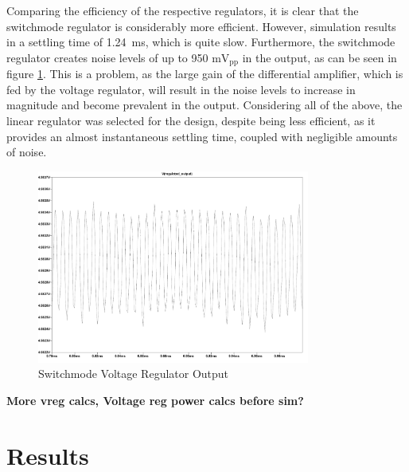 Comparing the efficiency of the respective regulators, it is clear that the switchmode regulator is considerably more efficient. However, simulation results in a settling time of \SI{1.24}{ms}, which is quite slow. Furthermore, the switchmode regulator creates noise levels of up to 950 $\mathrm{mV_{pp}}$ in the output, as can be seen in figure \ref{fig:smnoise}. This is a problem, as the large gain of the differential amplifier, which is fed by the voltage regulator, will result in the noise levels to increase in magnitude and become prevalent in the output. Considering all of the above, the linear regulator was selected for the design, despite being less efficient, as it provides an almost instantaneous settling time, coupled with negligible amounts of noise.

\begin{figure}[h]
    \centering
    \includegraphics[width = 0.8\textwidth]{Figures/smnoise}
    \caption{Switchmode Voltage Regulator Output}
    \label{fig:smnoise}
\end{figure}

\textbf{More vreg calcs, Voltage reg power calcs before sim?}

\section{Results} \label{sec:volt_results}

